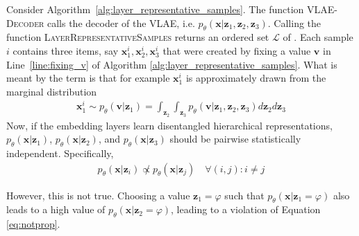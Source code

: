 Consider Algorithm~\ref{alg:layer_representative_samples}.
The function \textsc{VLAE-Decoder} calls the decoder of the VLAE, i.e. $p_\theta(\bm{x} | \bm{z}_1, \bm{z}_2, \bm{z}_3)$.
Calling the function \textsc{LayerRepresentativeSamples} returns an ordered set $\mathcal{L}$ of .
Each sample $i$ contains three items, say $\bm{x}_1^i, \bm{x}_2^i, \bm{x}_3^i$ that were created by fixing a value $\bm{v}$ in Line~\ref{line:fixing_v} of Algorithm \ref{alg:layer_representative_samples}.
What is meant by the term  is that for example $\bm{x}_1^i$ is approximately drawn from the marginal distribution
\begin{align}
    \bm{x}_1^i \sim p_\theta(\bm{v} | \bm{z}_1) = \int_{\bm{z}_2} \int_{\bm{z}_3} p_\theta(\bm{v} | \bm{z}_1, \bm{z}_2, \bm{z}_3) d\bm{z}_2 d\bm{z}_3
\end{align}
Now, if the embedding layers learn disentangled hierarchical representations, $p_\theta(\bm{x} | \bm{z}_1)$, $p_\theta(\bm{x} | \bm{z}_2)$, and $p_\theta(\bm{x} | \bm{z}_3)$ should be pairwise statistically independent.
Specifically,
\begin{align}
    p_\theta(\bm{x} | \bm{z}_i) \not \propto p_\theta(\bm{x} | \bm{z}_j) \quad \forall (i,j):i\neq j \label{eq:notprop}
\end{align}

However, this is not true.
Choosing a value $\bm{z}_1 = \varphi$ such that $p_\theta(\bm{x} | \bm{z}_1 = \varphi)$ also leads to a high value of $p_\theta(\bm{x} | \bm{z}_2 = \varphi)$, leading to a violation of Equation \ref{eq:notprop}.

